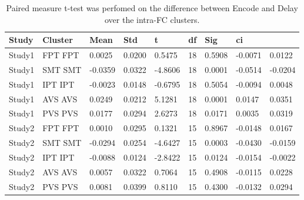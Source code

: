 \begin{table}
\centering
\begin{tabular}[0.2em]{@{}lllllllll@{}}\toprule
Study & Cluster & Mean & Std & t & df & Sig & ci\\\toprule[0.2em]
Study1 & FPT FPT & 0.0025 & 0.0200 & 0.5475 & 18 & 0.5908 & -0.0071 & 0.0122 \\\midrule
Study1 & SMT SMT & -0.0359 & 0.0322 & -4.8606 & 18 & 0.0001 & -0.0514 & -0.0204 \\\midrule
Study1 & IPT IPT & -0.0023 & 0.0148 & -0.6795 & 18 & 0.5054 & -0.0094 & 0.0048 \\\midrule
Study1 & AVS AVS & 0.0249 & 0.0212 & 5.1281 & 18 & 0.0001 & 0.0147 & 0.0351 \\\midrule
Study1 & PVS PVS & 0.0177 & 0.0294 & 2.6273 & 18 & 0.0171 & 0.0035 & 0.0319 \\\midrule
Study2 & FPT FPT & 0.0010 & 0.0295 & 0.1321 & 15 & 0.8967 & -0.0148 & 0.0167 \\\midrule
Study2 & SMT SMT & -0.0294 & 0.0254 & -4.6427 & 15 & 0.0003 & -0.0430 & -0.0159 \\\midrule
Study2 & IPT IPT & -0.0088 & 0.0124 & -2.8422 & 15 & 0.0124 & -0.0154 & -0.0022 \\\midrule
Study2 & AVS AVS & 0.0057 & 0.0322 & 0.7064 & 15 & 0.4908 & -0.0115 & 0.0228 \\\midrule
Study2 & PVS PVS & 0.0081 & 0.0399 & 0.8110 & 15 & 0.4300 & -0.0132 & 0.0294 \\\bottomrule[0.2em]
\end{tabular}
\caption{Paired measure t-test was perfomed on the difference between Encode and Delay over the intra-FC clusters.\label{tabel:GDEMFC}}
\end{table}
